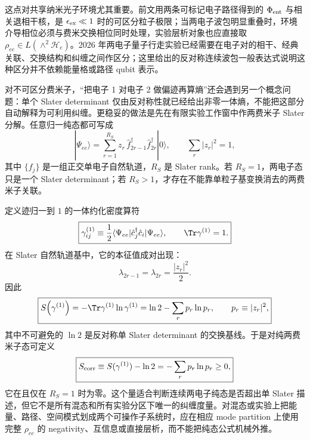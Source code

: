 这点对共享纳米光子环境尤其重要。前文用两条可标记电子路径得到的
$\Phi_{\rm ent}$ 与相关退相干核，是 $\epsilon_{\rm ex}\ll1$ 时的可区分粒子极限；当两电子波包明显重叠时，环境介导相位必须与费米交换相位同时处理，实验层析对象也应直接取
$\rho_{ee}\in L(\wedge^2\mathcal H_e)$。2026 年两电子量子行走实验已经需要在电子对的相干、经典关联、交换结构和纠缠之间作区分\cite{Tziperman2026TwoElectron}；这里给出的反对称连续波包一般表达式说明这种区分并不依赖能量格或路径 qubit 表示。

对不可区分费米子，“把电子 1 对电子 2 做偏迹再算熵”还会遇到另一个概念问题：单个 Slater determinant 仅由反对称性就已经给出非零一体熵，不能把这部分自动解释为可利用纠缠。更稳妥的做法是先在有限实验工作窗中作两费米子 Slater 分解。任意归一纯态都可写成
\begin{equation}
\boxed{
|\Psi_{ee}\rangle
=\sum_{r=1}^{R_S}z_r\,
\hat f_{2r-1}^\dagger\hat f_{2r}^\dagger|0\rangle,
\qquad
\sum_r|z_r|^2=1,}
\label{eq:two_fermion_slater_decomposition}
\end{equation}
其中 $\{f_j\}$ 是一组正交单电子自然轨道，$R_S$ 是 Slater rank。若 $R_S=1$，两电子态只是一个 Slater determinant；若 $R_S>1$，才存在不能靠单粒子基变换消去的两费米子关联。

定义迹归一到 $1$ 的一体约化密度算符
\begin{equation}
\boxed{
\gamma^{(1)}_{ij}
\equiv
\frac12\langle\Psi_{ee}|\hat c_j^\dagger\hat c_i|\Psi_{ee}\rangle,
\qquad
\Tr\gamma^{(1)}=1.}
\label{eq:two_fermion_normalized_one_body_rdm}
\end{equation}
在 Slater 自然轨道基中，它的本征值成对出现：
\[
\lambda_{2r-1}=\lambda_{2r}=\frac{|z_r|^2}{2}.
\]
因此
\begin{equation}
\boxed{
S\!\left(\gamma^{(1)}\right)
=-\Tr\gamma^{(1)}\ln\gamma^{(1)}
=\ln2-\sum_r p_r\ln p_r,
\qquad p_r\equiv|z_r|^2,}
\label{eq:two_fermion_one_body_entropy_slater}
\end{equation}
其中不可避免的 $\ln2$ 是反对称单 Slater determinant 的交换基线。于是对纯两费米子态可定义
\begin{equation}
\boxed{
S_{\rm corr}
\equiv S(\gamma^{(1)})-\ln2
=-\sum_r p_r\ln p_r\ge0,}
\label{eq:two_fermion_correlation_entropy}
\end{equation}
它在且仅在 $R_S=1$ 时为零。这个量适合判断连续两电子纯态是否超出单 Slater 描述，但它不是所有混态和所有实验分区下唯一的纠缠度量。对混态或实验上把能量、路径、空间模式划成两个可操作子系统时，应在相应 mode partition 上使用完整 $\rho_{ee}$ 的 negativity、互信息或直接层析，而不能把纯态公式机械外推。


